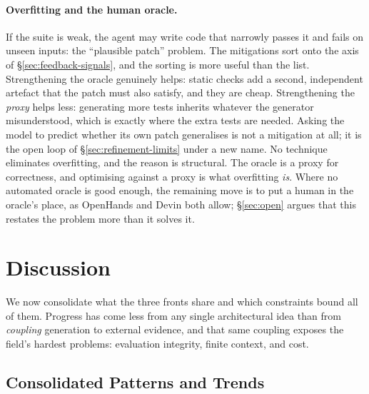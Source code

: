 \documentclass[
  english,        %
  font=times,     %
  twocolumn,      %
]{tumarticle}
\begin{document}
\paragraph{Overfitting and the human oracle.}
If the suite is weak, the agent may write code that narrowly passes it and fails
on unseen inputs: the ``plausible patch'' problem. The mitigations sort onto the
axis of \S\ref{sec:feedback-signals}, and the sorting is more useful than the
list. Strengthening the oracle genuinely helps: static checks add a second,
independent artefact that the patch must also satisfy, and they are cheap.
Strengthening the \emph{proxy} helps less: generating more tests inherits whatever
the generator misunderstood, which is exactly where the extra tests are needed.
Asking the model to predict whether its own patch generalises is not a mitigation
at all; it is the open loop of \S\ref{sec:refinement-limits} under a new name. No
technique eliminates overfitting, and the reason is structural. The oracle is a
proxy for correctness, and optimising against a proxy is what overfitting
\emph{is}. Where no automated oracle is good enough, the remaining move is to put
a human in the oracle's place, as OpenHands and Devin both allow;
\S\ref{sec:open} argues that this restates the problem more than it solves it.


\section{Discussion}
\label{sec:discussion}

We now consolidate what the three fronts share and which constraints bound all of
them. Progress has come less from any single architectural idea than from
\emph{coupling} generation to external evidence, and that same coupling exposes
the field's hardest problems: evaluation integrity, finite context, and cost.

\subsection{Consolidated Patterns and Trends}
\end{document}
